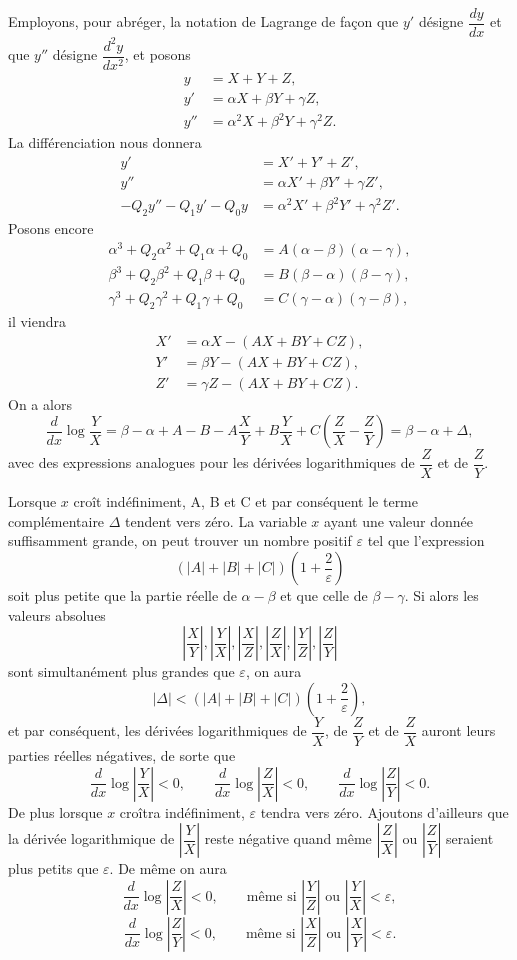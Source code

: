 \documentclass[11pt]{article}
\begin{document}
Employons, pour abréger, la notation de Lagrange de façon que $y'$ désigne $\dfrac{dy}{dx}$ et que $y''$ désigne $\dfrac{d^2y}{dx^2}$, et posons
\[
\begin{aligned}
y&=X+Y+Z,\\
y'&=\alpha X+\beta Y+\gamma Z,\\
y''&=\alpha^2X+\beta^2Y+\gamma^2Z.
\end{aligned}
\]
La différenciation nous donnera
\[
\begin{aligned}
y'&=X'+Y'+Z',\\
y''&=\alpha X'+\beta Y'+\gamma Z',\\
-Q_2y''-Q_1y'-Q_0y&=\alpha^2X'+\beta^2Y'+\gamma^2Z'.
\end{aligned}
\]
Posons encore
\[
\begin{aligned}
\alpha^3+Q_2\alpha^2+Q_1\alpha+Q_0&=A(\alpha-\beta)(\alpha-\gamma),\\
\beta^3+Q_2\beta^2+Q_1\beta+Q_0&=B(\beta-\alpha)(\beta-\gamma),\\
\gamma^3+Q_2\gamma^2+Q_1\gamma+Q_0&=C(\gamma-\alpha)(\gamma-\beta),
\end{aligned}
\]
il viendra
\[
\begin{aligned}
X'&=\alpha X-(AX+BY+CZ),\\
Y'&=\beta Y-(AX+BY+CZ),\\
Z'&=\gamma Z-(AX+BY+CZ).
\end{aligned}
\]
On a alors
\[
\frac{d}{dx}\log\frac{Y}{X}
=\beta-\alpha+A-B-A\frac{X}{Y}+B\frac{Y}{X}+C\left(\frac{Z}{X}-\frac{Z}{Y}\right)
=\beta-\alpha+\Delta,
\]
avec des expressions analogues pour les dérivées logarithmiques de $\dfrac{Z}{X}$ et de $\dfrac{Z}{Y}$.

Lorsque $x$ croît indéfiniment, A, B et C et par conséquent le terme complémentaire $\Delta$ tendent vers zéro. La variable $x$ ayant une valeur donnée suffisamment grande, on peut trouver un nombre positif $\varepsilon$ tel que l'expression
\[
(|A|+|B|+|C|)\left(1+\frac2\varepsilon\right)
\]
soit plus petite que la partie réelle de $\alpha-\beta$ et que celle de $\beta-\gamma$. Si alors les valeurs absolues
\[
\left|\frac{X}{Y}\right|,
\left|\frac{Y}{X}\right|,
\left|\frac{X}{Z}\right|,
\left|\frac{Z}{X}\right|,
\left|\frac{Y}{Z}\right|,
\left|\frac{Z}{Y}\right|
\]
sont simultanément plus grandes que $\varepsilon$, on aura
\[
|\Delta|<(|A|+|B|+|C|)\left(1+\frac2\varepsilon\right),
\]
et par conséquent, les dérivées logarithmiques de $\dfrac{Y}{X}$, de $\dfrac{Z}{Y}$ et de $\dfrac{Z}{X}$ auront leurs parties réelles négatives, de sorte que
\[
\frac{d}{dx}\log\left|\frac{Y}{X}\right|<0,
\qquad
\frac{d}{dx}\log\left|\frac{Z}{X}\right|<0,
\qquad
\frac{d}{dx}\log\left|\frac{Z}{Y}\right|<0.
\]
De plus lorsque $x$ croîtra indéfiniment, $\varepsilon$ tendra vers zéro. Ajoutons d'ailleurs que la dérivée logarithmique de $\left|\dfrac{Y}{X}\right|$ reste négative quand même $\left|\dfrac{Z}{X}\right|$ ou $\left|\dfrac{Z}{Y}\right|$ seraient plus petits que $\varepsilon$. De même on aura
\[
\frac{d}{dx}\log\left|\frac{Z}{X}\right|<0,
\qquad\text{même si }\left|\frac{Y}{Z}\right|\text{ ou }\left|\frac{Y}{X}\right|<\varepsilon,
\]
\[
\frac{d}{dx}\log\left|\frac{Z}{Y}\right|<0,
\qquad\text{même si }\left|\frac{X}{Z}\right|\text{ ou }\left|\frac{X}{Y}\right|<\varepsilon.
\]
\end{document}
